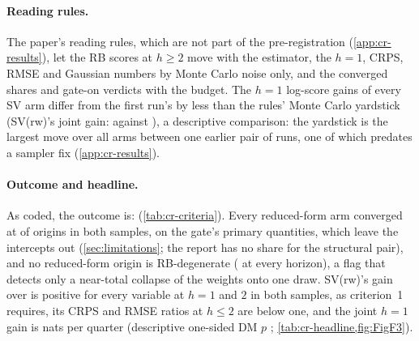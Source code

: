 \paragraph{Reading rules.}
The paper's reading rules, which are not part of the pre-registration (\cref{app:cr-results}), let
the RB scores at $h \geq 2$ move with the estimator, the $h = 1$, CRPS, RMSE and Gaussian numbers by
Monte Carlo noise only, and the converged shares and gate-on verdicts with the budget. %
The $h = 1$ log-score gains of every SV arm differ from the first run's by less than the rules' Monte
Carlo yardstick (SV(rw)'s joint gain:  against
), a descriptive comparison: the yardstick is the largest move over all arms
between one earlier pair of runs, one of which predates a sampler fix (\cref{app:cr-results}).

\paragraph{Outcome and headline.}
As coded, the outcome is:  (\cref{tab:cr-criteria}). %
Every reduced-form arm converged at  of origins in both samples, on
the gate's primary quantities, which leave the intercepts out (\cref{sec:limitations}; the report
has no share for the structural pair), and no reduced-form origin is RB-degenerate
( at every horizon), a flag that detects only a
near-total collapse of the weights onto one draw. %
SV(rw)'s gain over  is positive for every variable at $h = 1$ and $2$ in both
samples, as criterion~1 requires, its CRPS and RMSE ratios at $h \leq 2$ are below one, and the
joint $h = 1$ gain is  nats per quarter (descriptive
one-sided DM $p$ ; \cref{tab:cr-headline,fig:FigF3}). %

